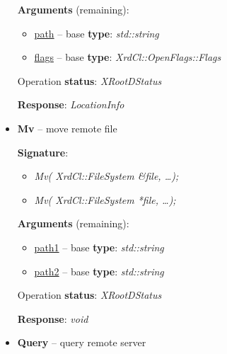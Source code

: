 \documentclass{article}
\begin{document}
\begin{itemize}
\begin{samepage}
                    \textbf{Arguments} (remaining):
                    \begin{itemize}
                        \item \underline{path} -- base \textbf{type}: \textit{std::string}
                        \item \underline{flags} -- base \textbf{type}: \textit{XrdCl::OpenFlags::Flags}
                    \end{itemize}

                    Operation \textbf{status}: \textit{XRootDStatus}

                    \textbf{Response}: \textit{LocationInfo}
                    
                \end{samepage}
                    
                \item \begin{samepage} \textbf{Mv} -- move remote file

                    \textbf{Signature}:
                    \begin{itemize}
                        \item \textit{Mv( XrdCl::FileSystem \&file, \ldots);}
                        \item \textit{Mv( XrdCl::FileSystem *file, \ldots );}
                    \end{itemize}

                    \textbf{Arguments} (remaining):
                    \begin{itemize}
                        \item \underline{path1} -- base \textbf{type}: \textit{std::string}
                        \item \underline{path2} -- base \textbf{type}: \textit{std::string}
                    \end{itemize}

                    Operation \textbf{status}: \textit{XRootDStatus}

                    \textbf{Response}: \textit{void}
                    
                \end{samepage}
                    
                \item \begin{samepage} \textbf{Query} -- query remote server


\end{samepage}
\end{itemize}
\end{document}
